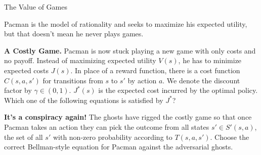 


\begin{problem}[]{The Value of Games}

Pacman is the model of rationality and seeks to maximize his expected utility,\\
but that doesn't mean he never plays games.


\begin{question}[4] \textbf{A Costly Game.}
  Pacman is now stuck playing a new game with only costs and no payoff. Instead
  of maximizing expected utility $V(s)$, he has to minimize expected costs
  $J(s)$.  In place of a reward function, there is a cost function $C(s,a,s')$
  for transitions from $s$ to $s'$ by action $a$. We denote the discount
  factor by $\gamma \in (0,1)$. $J^*(s)$ is the expected cost incurred by the
  optimal policy. Which one of the following equations is satisfied by $J^*$?

\TwoA


\end{question}


\begin{question}[4] \textbf{It's a conspiracy again!}
  The ghosts have rigged the costly game so that once Pacman takes an action
  they can pick the outcome from all states $s' \in S'(s,a)$, the set of all
  $s'$ with non-zero probability according to $T(s,a,s')$. Choose the correct
  Bellman-style equation for Pacman against the adversarial ghosts.

\TwoB
\end{question}

\vspace{-.4in}

\end{problem}
